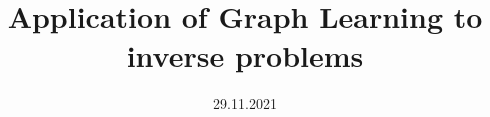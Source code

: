 \documentclass[a4paper, 10pt, oneside]{memoir}
\title				{Application of Graph Learning to inverse problems}
\date				{29.11.2021}
\begin{document}

\thesisfront
\maketitle
\pagestyle{thesis}
% 
%
\thesistoc
\thesismain

%



%
%
%
%


\thesisbib
\begin{appendices}
	 
\end{appendices}
\end{document}
